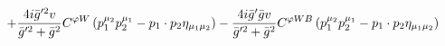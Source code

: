 %
\begin{dmath*}
%
  +  \frac{4 i {\bar g}^{\prime 2} v}{{\bar g}^{\prime 2} + {\bar g}{}^2}C^{ \varphi  W} \left(p_1^{\mu_2} p_2^{\mu_1} - p_{1}\nobreak\cdot\nobreak{}p_{2} \eta_{\mu_1 \mu_2}\right)  -  \frac{4 i {\bar g}^\prime {\bar g}{} v}{{\bar g}^{\prime 2} + {\bar g}{}^2}C^{ \varphi  WB} \left(p_1^{\mu_2} p_2^{\mu_1} - p_{1}\nobreak\cdot\nobreak{}p_{2} \eta_{\mu_1 \mu_2}\right)
%
\end{dmath*}
%
